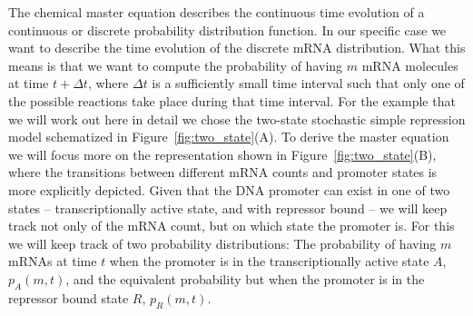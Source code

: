 The chemical master equation describes the continuous time evolution of a
continuous or discrete probability distribution function. In our specific case
we want to describe the time evolution of the discrete mRNA distribution. What
this means is that we want to compute the probability of having $m$ mRNA
molecules at time $t + \Delta t$, where $\Delta t$ is a sufficiently small time
interval such that only one of the possible reactions take place during that
time interval. For the example that we will work out here in detail we chose the
two-state stochastic simple repression model schematized in
Figure~\ref{fig:two_state}(A). To derive the master equation we will focus more
on the representation shown in Figure~\ref{fig:two_state}(B), where the
transitions between different mRNA counts and promoter states is more explicitly
depicted. Given that the DNA promoter can exist in one of two states --
transcriptionally active state, and with repressor bound -- we will keep track
not only of the mRNA count, but on which state the promoter is. For this we will
keep track of two probability distributions: The probability of having $m$ mRNAs
at time $t$ when the promoter is in the transcriptionally active state $A$,
$p_A(m, t)$, and the equivalent probability but when the promoter is in the
repressor bound state $R$, $p_R(m, t)$.

